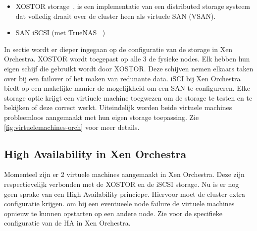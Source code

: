 \begin{itemize}
    \item XOSTOR storage~\autocite{vates_xostor}, is een implementatie van een distributed storage systeem dat volledig draait over de cluster heen als virtuele SAN (VSAN).
    \item SAN iSCSI (met TrueNAS ~\autocite{truenas})
\end{itemize}
In sectie  wordt er dieper ingegaan op de configuratie van de storage in Xen Orchestra.
XOSTOR wordt toegepast op alle 3 de fysieke nodes. Elk hebben hun eigen schijf die gebruikt wordt door XOSTOR. Deze schijven nemen elkaars taken over bij een failover of het maken van redunante data.
iSCI bij Xen Orchestra biedt op een makelijke manier de mogelijkheid om een SAN te configureren.
Elke storage optie krijgt een virtiuele machine toegwezen om de storage te testen en te bekijken of deze correct werkt.
Uiteindelijk worden beide virtuele machines probleemloos aangemaakt met hun eigen storage toepassing. Zie \ref{fig:virtuelemachines-orch} voor meer details.

\subsection{High Availability in Xen Orchestra}%
Momenteel zijn er 2 virtuele machines aangemaakt in Xen Orchestra. Deze zijn respectievelijk verbonden met de XOSTOR en de iSCSI storage.
Nu is er nog geen sprake van een High Availability princiepe. Hiervoor moet de cluster extra configuratie krijgen. om bij een eventueele node failure de virtuele machines opnieuw te kunnen opstarten op een andere node.
Zie  voor de specifieke configuratie van de HA in Xen Orchestra.

